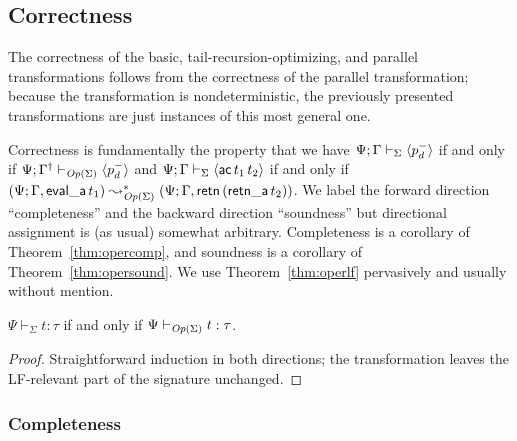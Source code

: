 \subsection{Correctness}
\label{sec:operationalization-correct}

The correctness of the basic, tail-recursion-optimizing, and parallel
transformations follows from the correctness of the parallel
transformation; because the transformation is nondeterministic, the
previously presented transformations are just instances of this most
general one. 

Correctness is fundamentally the property that
we have ${\Psi}; {\Gamma} \vdash_{\Sigma} {\langle {p^-_d} \rangle}$ if and only if 
${\Psi}; {{{\Gamma}^\dag}} \vdash_{{\it Op}({\Sigma})} {\langle {p^-_d} \rangle}$
and ${\Psi}; {\Gamma} \vdash_{\Sigma} {\langle {{\sf ac}\,t_1\,t_2} \rangle}$ if and only if
$(\Psi; {\Gamma},{{\sf eval\_a}\,t_1}) \leadsto^*_{{\it Op}({\Sigma})} (\Psi; {\Gamma},{{\sf retn}\,({\sf retn\_a}\,t_2)})$. We label the
forward direction ``completeness'' and the backward direction ``soundness''
but directional assignment is (as usual) somewhat arbitrary. 
Completeness is a corollary
of Theorem~\ref{thm:opercomp}, and soundness is a corollary of 
Theorem~\ref{thm:opersound}. We use Theorem~\ref{thm:operlf} pervasively
and usually without mention. 

\bigskip
\begin{theorem}\label{thm:operlf}
  $\Psi \vdash_\Sigma t : \tau$ if and only if $\Psi
  \vdash_{{\it Op}({\Sigma})} t : \tau$.
\end{theorem}

\begin{proof}
Straightforward induction in both directions; the transformation 
leaves the LF-relevant part of the signature unchanged.
\end{proof}

\subsubsection{Completeness}

